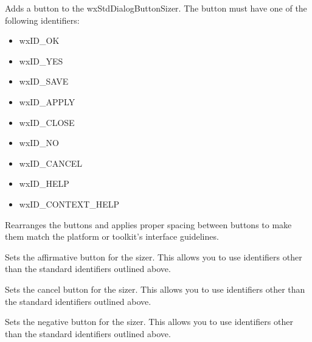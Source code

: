 
Adds a button to the wxStdDialogButtonSizer. The button must have one of the following identifiers:

\begin{itemize}\itemsep=0pt
\item wxID\_OK
\item wxID\_YES
\item wxID\_SAVE
\item wxID\_APPLY
\item wxID\_CLOSE
\item wxID\_NO
\item wxID\_CANCEL
\item wxID\_HELP
\item wxID\_CONTEXT\_HELP
\end{itemize}

\label{wxstddialogbuttonsizerrealize}


Rearranges the buttons and applies proper spacing between buttons to make them match the platform or toolkit's interface guidelines.

\label{wxstddialogbuttonsizersetaffirmativebutton}


Sets the affirmative button for the sizer. This allows you to use identifiers other than the standard identifiers outlined above.

\label{wxstddialogbuttonsizersetcancelbutton}


Sets the cancel button for the sizer. This allows you to use identifiers other than the standard identifiers outlined above.

\label{wxstddialogbuttonsizersetnegativebutton}


Sets the negative button for the sizer. This allows you to use identifiers other than the standard identifiers outlined above.

